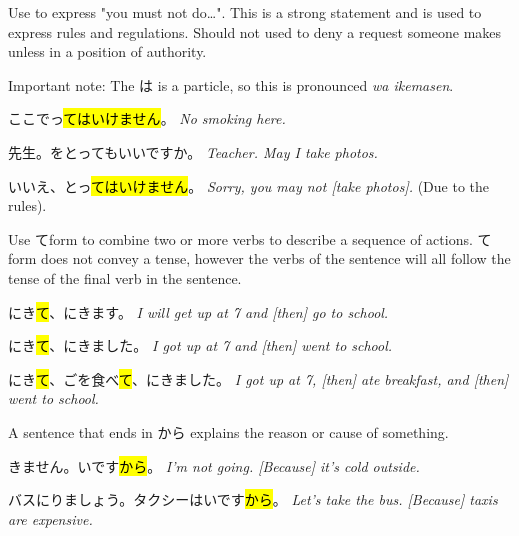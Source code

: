     {
    Use to express "you must not do\dots". This is a strong statement and is used to express rules and regulations. Should not used to deny a request someone makes unless in a position of authority.
    
    \begin{center}
    \end{center}
    
    Important note: The は is a particle, so this is pronounced \textit{wa ikemasen}.
    
    ここでっ\hl{てはいけません}。
    \textit{No smoking here.}
    
    \sectionSplit
     
    先生。をとってもいいですか。
    \textit{Teacher. May I take photos.}
    
    いいえ、とっ\hl{てはいけません}。
    \textit{Sorry, you may not [take photos].} (Due to the rules).
    }

    {
    Use てform to combine two or more verbs to describe a sequence of actions. てform does not convey a tense, however the verbs of the sentence will all follow the tense of the final verb in the sentence.
    
    にき\hl{て}、にきます。
    \textit{I will get up at 7 and [then] go to school.}
    
    にき\hl{て}、にきました。
    \textit{I got up at 7 and [then] went to school.}
    
    にき\hl{て}、ごを食べ\hl{て}、にきました。
    \textit{I got up at 7, [then] ate breakfast, and [then] went to school.}
    }

    {
    A sentence that ends in から explains the reason or cause of something.
    
    \begin{center}
    \end{center}
    
    きません。いです\hl{から}。
    \textit{I'm not going. [Because] it's cold outside.}
    
    バスにりましょう。タクシーはいです\hl{から}。
    \textit{Let's take the bus. [Because] taxis are expensive.}
    }

